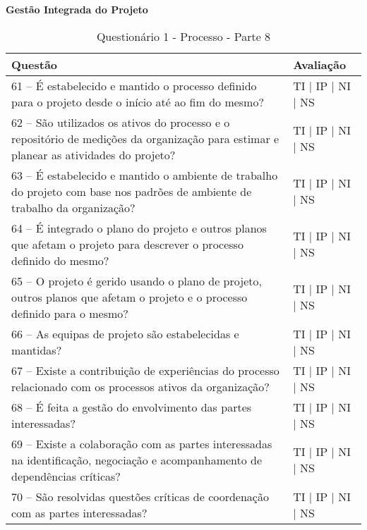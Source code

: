 \documentclass[openany,10pt,a4paper]{article}
\begin{document}
\begin{appendix}
\begin{table}[h]
\textbf{Gestão Integrada do Projeto}
	\centering
	\caption{Questionário 1 - Processo - Parte 8}
	\begin{tabular}{p{3.5in}p{2in}}		
		\toprule
		\textbf{Questão}  & \textbf{Avaliação}\\ 
		\midrule
		61 – É estabelecido e mantido o processo definido para o projeto desde o início até ao fim do mesmo?
 & TI | IP | NI | NS \\
        \midrule
		62 – São utilizados os ativos do processo e o repositório de medições da organização para 
estimar e planear as atividades do projeto?
 & TI | IP | NI | NS \\
		\midrule
		63 – É estabelecido e mantido o ambiente de trabalho do projeto com base nos padrões de 
ambiente de trabalho da organização?
 & TI | IP | NI | NS \\
		\midrule
        64 – É integrado o plano do projeto e outros planos que afetam o projeto para descrever o 
processo definido do mesmo?
 & TI | IP | NI | NS \\
		\midrule
		65 – O projeto é gerido usando o plano de projeto, outros planos que afetam o projeto e o 
processo definido para o mesmo?
  & TI | IP | NI | NS \\
		\midrule
		66 – As equipas de projeto são estabelecidas e mantidas?
 & TI | IP | NI | NS \\
        \midrule
		67 – Existe a contribuição de experiências do processo relacionado com os processos ativos da 
organização?
 & TI | IP | NI | NS \\
        \midrule
		68 – É feita a gestão do envolvimento das partes interessadas?
 & TI | IP | NI | NS \\
        \midrule
		69  – Existe a colaboração com as partes interessadas na identificação, negociação e 
acompanhamento de dependências críticas?
 & TI | IP | NI | NS \\
        \midrule
		70 – São resolvidas questões críticas de coordenação com as partes interessadas?
 & TI | IP | NI | NS \\
		\bottomrule
	\end{tabular} 
	\label{tab:tabela1}
\end{table}


\end{appendix}
\end{document}
